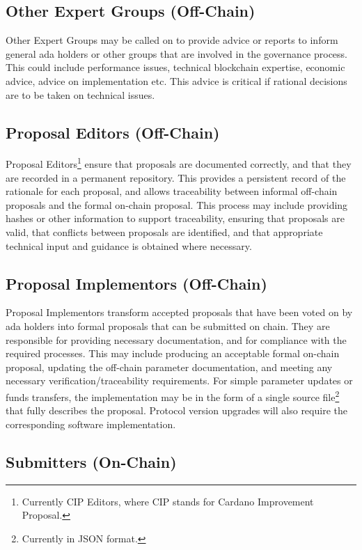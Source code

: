 \subsection{Other Expert Groups (Off-Chain)}

Other Expert Groups may be called on to provide advice or reports to inform general ada holders or other groups that are involved in the
governance process.  This could include performance issues, technical blockchain expertise, economic advice, advice on implementation etc.
This advice is critical if rational decisions are to be taken on technical issues.

\subsection{Proposal Editors (Off-Chain)}

Proposal Editors\footnote{Currently CIP Editors, where CIP stands for Cardano Improvement Proposal.} ensure that proposals are documented correctly, and that they are recorded in a
permanent repository.
This provides a persistent record of the rationale for each proposal, and allows traceability between informal off-chain
proposals and the formal on-chain proposal.  This process may include providing hashes or other information to support traceability,
ensuring that proposals are valid, that conflicts between proposals are identified, and that appropriate technical input and
guidance is obtained where necessary.

\subsection{Proposal Implementors (Off-Chain)}

Proposal Implementors transform accepted proposals that have been voted on by ada holders into formal proposals that can be submitted on chain.
They are responsible for providing necessary documentation, and for compliance with the required processes.  This may include producing an acceptable formal on-chain proposal,
updating the off-chain parameter documentation,
and meeting any necessary verification/traceability requirements.  For simple parameter updates or funds transfers, the implementation may be in the form of a single
source file\footnote{Currently in JSON format.} that fully describes the proposal. Protocol version upgrades will also require the corresponding software implementation.

\subsection{Submitters (On-Chain)}

